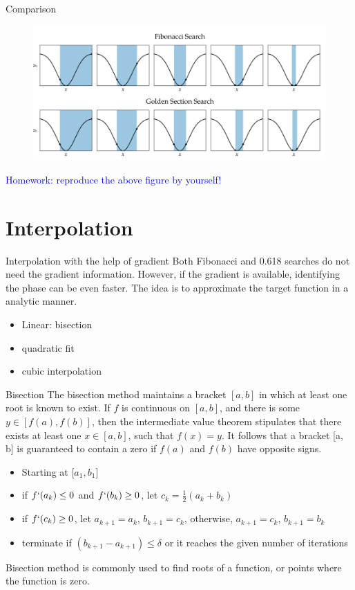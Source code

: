 \documentclass{beamer}
\begin{document}
\begin{frame}{Comparison}

\begin{figure}
\centering
\includegraphics[width=120mm]{Figs/search.jpeg}
\end{figure}

\textcolor{blue}{Homework: reproduce the above figure by yourself!}
\end{frame}

\section{Interpolation}

\begin{frame}{Interpolation with the help of gradient}
Both Fibonacci and 0.618 searches do not need the gradient information. However, if the gradient is available, identifying the phase can be even faster. The idea is to approximate the target function in a analytic manner. 
\begin{itemize}
    \item Linear: bisection
    \item quadratic fit
    \item cubic interpolation
\end{itemize}

\end{frame}

\begin{frame}{Bisection}
The bisection method maintains a bracket $[a, b]$ in which at least one root is known to exist. If $f$ is continuous on $[a, b]$, and there is some $y \in [ f (a), f (b)]$, then the intermediate value theorem stipulates that there exists at least one $x \in [a, b]$, such that $f(x) = y$. It follows that a bracket [a, b] is guaranteed to contain a zero if $f(a)$ and $f(b)$ have opposite signs.

\begin{itemize}
    \item Starting at [$a_1, b_1]$ 
    \item if $f`(a_k) \leq 0$ and $f`(b_k) \geq 0$, let $c_k = \frac{1}{2} (a_k + b_k)$
    \item if $f`(c_k) \geq 0$, let $a_{k+1} = a_k$, $b_{k+1}=c_k$, otherwise, $a_{k+1}=c_k$, $b_{k+1}=b_k$ 
    \item terminate if $(b_{k+1} - a_{k+1}) \leq \delta $ or it reaches the given number of iterations
\end{itemize}

Bisection method is commonly used to find roots of a function, or points where the function is zero.    
\end{frame}
\end{document}
